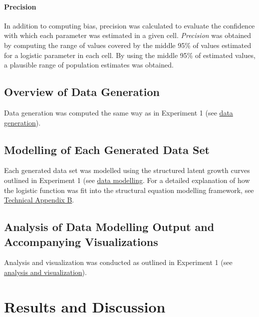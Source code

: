 \documentclass[
12pt, %
twoside,
english]{guelphthesis}
\theoremstyle{definition}
\theoremstyle{definition}
\theoremstyle{definition}
\theoremstyle{definition}
\theoremstyle{remark}
\begin{document}
\hypertarget{precision}{%
\paragraph{Precision}\label{precision}}

In addition to computing bias, precision was calculated to evaluate the confidence with which each parameter was estimated in a given cell. \emph{Precision} was obtained by computing the range of values covered by the middle 95\% of values estimated for a logistic parameter in each cell. By using the middle 95\% of estimated values, a plausible range of population estimates was obtained.

\hypertarget{overview-of-data-generation}{%
\subsection{Overview of Data Generation}\label{overview-of-data-generation}}

Data generation was computed the same way as in Experiment 1 (see \protect\hyperlink{data-generation}{data generation}).

\hypertarget{data-modelling-exp2}{%
\subsection{Modelling of Each Generated Data Set}\label{data-modelling-exp2}}

Each generated data set was modelled using the structured latent growth curves outlined in Experiment 1 (see \protect\hyperlink{data-modelling}{data modelling}. For a detailed explanation of how the logistic function was fit into the structural equation modelling framework, see \protect\hyperlink{structured-latent}{Technical Appendix B}.

\hypertarget{analysis-of-data-modelling-output-and-accompanying-visualizations}{%
\subsection{Analysis of Data Modelling Output and Accompanying Visualizations}\label{analysis-of-data-modelling-output-and-accompanying-visualizations}}

Analysis and visualization was conducted as outlined in Experiment 1 (see \protect\hyperlink{analysis-visualizationux5cux257D}{analysis and visualization}).

\hypertarget{results-and-discussion-1}{%
\section{Results and Discussion}\label{results-and-discussion-1}}
\end{document}
